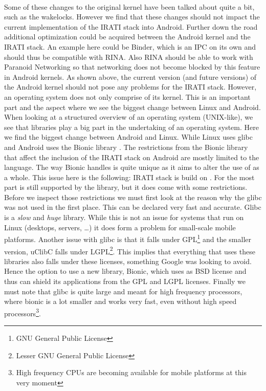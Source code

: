 \\
Some of these changes to the original kernel have been talked about quite a bit, such as the wakelocks. However we find that these changes should not impact the current implementation of the IRATI stack into Android. Further down the road additional optimization could be acquired between the Android kernel and the IRATI stack. An example here could be Binder, which is an IPC on its own and should thus be compatible with RINA. Also RINA should be able to work with Paranoid Networking so that networking does not become blocked by this feature in Android kernels. 
\npar
As shown above, the current version (and future versions) of the Android kernel should not pose any problems for the IRATI stack. However, an operating system does not only comprise of its kernel. This is an important part and the aspect where we see the biggest change between Linux and Android. When looking at a structured overview of an operating system (UNIX-like), we see that libraries play a big part in the undertaking of an operating system. Here we find the biggest change between Android and Linux. While Linux uses glibc \citep{website:glibc} and Android uses the Bionic library \citep{github:bionic,website:c_lib_bionic}. 
\npar
The restrictions from the Bionic library that affect the inclusion of the IRATI stack on Android are mostly limited to the \cpp language. The way Bionic handles \cpp is quite unique as it aims to alter the use of \cpp as a whole. This issue here is the following: IRATI stack is build on \cpp. For the most part \cpp is still supported by the library, but it does come with some restrictions. Before we inspect those restrictions we must first look at the reason why the glibc was not used in the first place. This can be declared very fast and accurate. Glibc is a \emph{slow} and \emph{huge} library. While this is not an issue for systems that run on Linux (desktops, servers, \ldots) it does form a problem for small-scale mobile platforms. Another issue with glibc is that it falls under GPL\footnote{GNU General Public License} and the smaller version, uClibC falls under LGPL\footnote{Lesser GNU General Public License}. This implies that everything that uses these libraries also falls under these licenses, something Google was looking to avoid. Hence the option to use a new library, Bionic, which uses as BSD license and thus can shield its applications from the GPL and LGPL licenses. Finally we must note that glibc is quite large and meant for high frequency processors, where bionic is a lot smaller and works very fast, even without high speed processors\footnote{High frequency CPUs are becoming available for mobile platforms at this very moment}.

